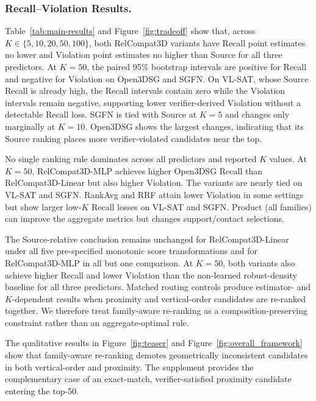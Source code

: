 \subsubsection{Recall–Violation Results.}
Table~\ref{tab:main-results} and Figure~\ref{fig:tradeoff} show that, across $K\in\{5,10,20,50,100\}$, both RelCompat3D variants have Recall point estimates no lower and Violation point estimates no higher than Source for all three predictors. At $K=50$, the paired 95\% bootstrap intervals are positive for Recall and negative for Violation on Open3DSG and SGFN. On VL-SAT, whose Source Recall is already high, the Recall intervals contain zero while the Violation intervals remain negative, supporting lower verifier-derived Violation without a detectable Recall loss. SGFN is tied with Source at $K=5$ and changes only marginally at $K=10$. Open3DSG shows the largest changes, indicating that its Source ranking places more verifier-violated candidates near the top.

No single ranking rule dominates across all predictors and reported $K$
values. At $K=50$, RelCompat3D-MLP achieves higher Open3DSG Recall than
RelCompat3D-Linear but also higher Violation. The variants are nearly tied on VL-SAT and SGFN. RankAvg and RRF attain lower Violation in some settings but show larger low-$K$ Recall losses on VL-SAT and SGFN. Product (all families) can improve the aggregate metrics but changes support/contact selections.

The Source-relative conclusion remains unchanged for RelCompat3D-Linear under all five pre-specified monotonic score transformations and for RelCompat3D-MLP in all but one comparison. At $K=50$, both variants also achieve higher Recall and lower Violation than the non-learned robust-density baseline for all three predictors. Matched routing controls produce estimator- and $K$-dependent results when proximity and vertical-order candidates are re-ranked together. We therefore treat family-aware re-ranking as a composition-preserving constraint rather than an aggregate-optimal rule.

The qualitative results in Figure~\ref{fig:teaser} and Figure~\ref{fig:overall_framework} show that family-aware re-ranking demotes geometrically inconsistent candidates in both vertical-order and proximity. The supplement provides the complementary case of an exact-match, verifier-satisfied proximity candidate entering the top-50.

